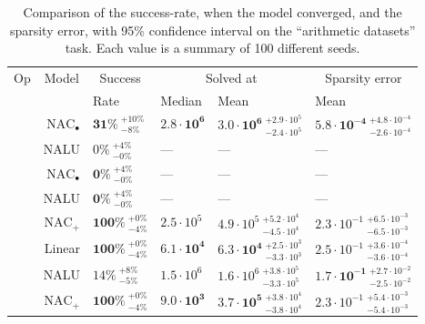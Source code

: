 \begin{table}[!h]

\caption{\label{tab:function-task-static-defaults}Comparison of the success-rate, when the model converged, and the sparsity error, with 95\% confidence interval on the ``arithmetic datasets'' task. Each value is a summary of 100 different seeds.}
\centering
\begin{tabular}{crllll}
\toprule
\multicolumn{1}{c}{Op} & \multicolumn{1}{c}{Model} & \multicolumn{1}{c}{Success} & \multicolumn{2}{c}{Solved at} & \multicolumn{1}{c}{Sparsity error} \\
\cmidrule(l{3pt}r{3pt}){1-1} \cmidrule(l{3pt}r{3pt}){2-2} \cmidrule(l{3pt}r{3pt}){3-3} \cmidrule(l{3pt}r{3pt}){4-5} \cmidrule(l{3pt}r{3pt}){6-6}
 &  & Rate & Median & Mean & Mean\\
\midrule
 & $\mathrm{NAC}_{\bullet}$ & $\mathbf{31\%} {~}^{+10\%}_{-8\%}$ & $\mathbf{2.8 \cdot 10^{6}}$ & $\mathbf{3.0 \cdot 10^{6}} {~}^{+2.9 \cdot 10^{5}}_{-2.4 \cdot 10^{5}}$ & $\mathbf{5.8 \cdot 10^{-4}} {~}^{+4.8 \cdot 10^{-4}}_{-2.6 \cdot 10^{-4}}$\\

\nopagebreak
\multirow{-2}{*}{\centering\arraybackslash $\bm{\times}$} & NALU & $0\% {~}^{+4\%}_{-0\%}$ & --- & --- & ---\\
\cmidrule{1-6}
 & $\mathrm{NAC}_{\bullet}$ & $\mathbf{0\%} {~}^{+4\%}_{-0\%}$ & --- & --- & ---\\

\nopagebreak
\multirow{-2}{*}{\centering\arraybackslash $\bm{\mathbin{/}}$} & NALU & $\mathbf{0\%} {~}^{+4\%}_{-0\%}$ & --- & --- & ---\\
\cmidrule{1-6}
 & $\mathrm{NAC}_{+}$ & $\mathbf{100\%} {~}^{+0\%}_{-4\%}$ & $2.5 \cdot 10^{5}$ & $4.9 \cdot 10^{5} {~}^{+5.2 \cdot 10^{4}}_{-4.5 \cdot 10^{4}}$ & $2.3 \cdot 10^{-1} {~}^{+6.5 \cdot 10^{-3}}_{-6.5 \cdot 10^{-3}}$\\

\nopagebreak
 & Linear & $\mathbf{100\%} {~}^{+0\%}_{-4\%}$ & $\mathbf{6.1 \cdot 10^{4}}$ & $\mathbf{6.3 \cdot 10^{4}} {~}^{+2.5 \cdot 10^{3}}_{-3.3 \cdot 10^{3}}$ & $2.5 \cdot 10^{-1} {~}^{+3.6 \cdot 10^{-4}}_{-3.6 \cdot 10^{-4}}$\\

\nopagebreak
\multirow{-3}{*}{\centering\arraybackslash $\bm{+}$} & NALU & $14\% {~}^{+8\%}_{-5\%}$ & $1.5 \cdot 10^{6}$ & $1.6 \cdot 10^{6} {~}^{+3.8 \cdot 10^{5}}_{-3.3 \cdot 10^{5}}$ & $\mathbf{1.7 \cdot 10^{-1}} {~}^{+2.7 \cdot 10^{-2}}_{-2.5 \cdot 10^{-2}}$\\
\cmidrule{1-6}
 & $\mathrm{NAC}_{+}$ & $\mathbf{100\%} {~}^{+0\%}_{-4\%}$ & $\mathbf{9.0 \cdot 10^{3}}$ & $\mathbf{3.7 \cdot 10^{5}} {~}^{+3.8 \cdot 10^{4}}_{-3.8 \cdot 10^{4}}$ & $2.3 \cdot 10^{-1} {~}^{+5.4 \cdot 10^{-3}}_{-5.4 \cdot 10^{-3}}$\\


\end{tabular}
\end{table}
